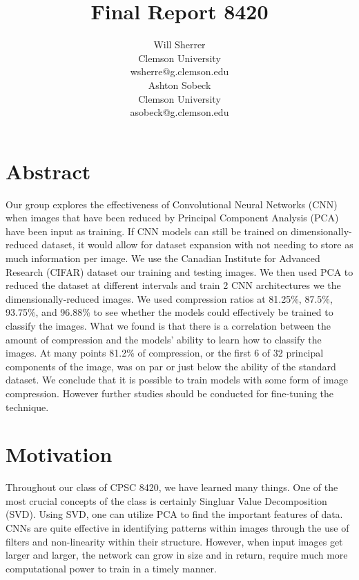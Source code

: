 \documentclass{article}
\title{Final Report 8420}
\author{%
	Will Sherrer \\
	Clemson University\\
	wsherre@g.clemson.edu \\
	\And Ashton Sobeck \\
	Clemson University\\
	asobeck@g.clemson.edu
}
\begin{document}
\maketitle
\section{Abstract} 

Our group explores the effectiveness of Convolutional Neural Networks (CNN) when  images that have been reduced by Principal Component Analysis (PCA) have been input as training. If CNN models can still be trained on dimensionally-reduced dataset, it would allow for dataset expansion with not needing to store as much information per image. We use the Canadian Institute for Advanced Research (CIFAR) dataset our training and testing images. We then used PCA to reduced the dataset at different intervals and train 2 CNN architectures we the dimensionally-reduced images. We used compression ratios at 81.25\%, 87.5\%, 93.75\%, and 96.88\% to see whether the models could effectively be trained to classify the images. What we found is that there is a correlation between the amount of compression and the models' ability to learn how to classify the images. At many points 81.2\% of compression, or the first 6 of 32 principal components of the image, was on par or just below the ability of the standard dataset. We conclude that it is possible to train models with some form of image compression. However further studies should be conducted for fine-tuning the technique. 

\section{Motivation}

Throughout our class of CPSC 8420, we have learned many things. 
One of the most crucial concepts of the class is certainly Singluar Value 
Decomposition (SVD). Using SVD, one can utilize PCA to find the important 
features of data. CNNs are quite effective in identifying patterns within 
images through the use of filters and non-linearity within their structure. 
However, when input images get larger and larger, the network can grow in 
size and in return, require much more computational power to train in a timely manner.
\end{document}
